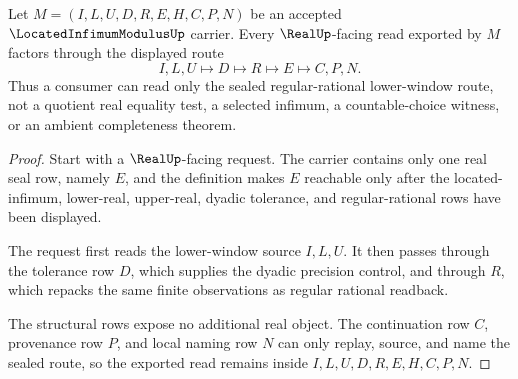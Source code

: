 \begin{theorem}
\label{thm:located-infimum-modulus-real-seal}
Let $M=(I,L,U,D,R,E,H,C,P,N)$ be an accepted $\LocatedInfimumModulusUp$ carrier. Every $\RealUp$-facing read exported by $M$ factors through the displayed route
$$
I,L,U \longmapsto D \longmapsto R \longmapsto E \longmapsto C,P,N .
$$
Thus a consumer can read only the sealed regular-rational lower-window route, not a quotient real equality test, a selected infimum, a countable-choice witness, or an ambient completeness theorem.
\end{theorem}
\begin{proof}
Start with a $\RealUp$-facing request. The carrier contains only one real seal row, namely $E$, and the definition makes $E$ reachable only after the located-infimum, lower-real, upper-real, dyadic tolerance, and regular-rational rows have been displayed.

The request first reads the lower-window source $I,L,U$. It then passes through the tolerance row $D$, which supplies the dyadic precision control, and through $R$, which repacks the same finite observations as regular rational readback.

The structural rows expose no additional real object. The continuation row $C$, provenance row $P$, and local naming row $N$ can only replay, source, and name the sealed route, so the exported read remains inside $I,L,U,D,R,E,H,C,P,N$.
\end{proof}


\begin{closurestatus}{\LocatedInfimumModulusUp}
  \theoryclosure{\seedClosure}
  \formalstatus{\unformalizedV}
\end{closurestatus}
